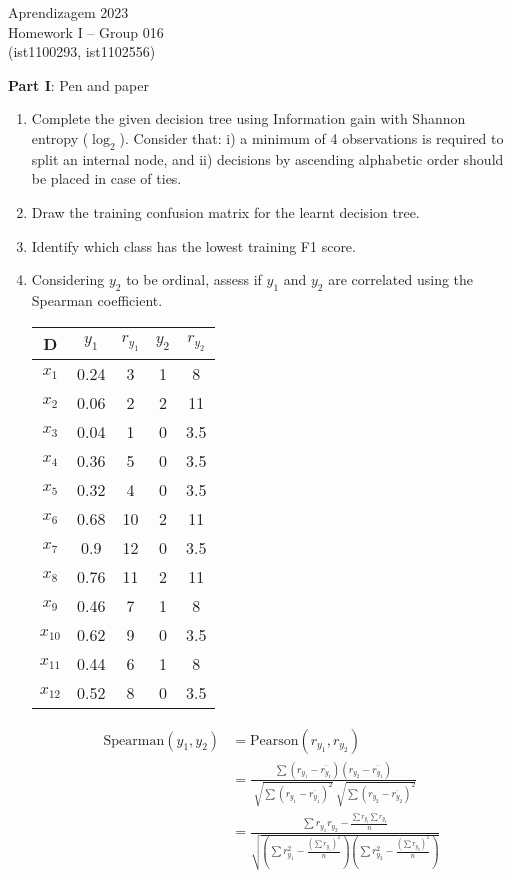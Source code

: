 \documentclass[12pt]{article}
\begin{document}
\center
Aprendizagem 2023\\
Homework I -- Group 016\\
(ist1100293, ist1102556)\vskip 1cm

\large{\textbf{Part I}: Pen and paper}\normalsize

\begin{enumerate}[leftmargin=\labelsep]
\item Complete the given decision tree using Information gain with Shannon entropy ($\log_2$).
Consider that: i) a minimum of 4 observations is required to split an internal node, and
ii) decisions by ascending alphabetic order should be placed in case of ties.
    

\item Draw the training confusion matrix for the learnt decision tree.

\item Identify which class has the lowest training F1 score.

\item Considering $y_2$ to be ordinal, assess if $y_1$ and $y_2$ are correlated using the Spearman coefficient.
\begin{center}
    
    \begin{tabular}{|c | c | c | c | c|}
        \hline
        D & $y_1$ & $r_{y_1}$ & $y_2$ & $r_{y_2}$\\
        \hline
        $x_1$    & 0.24 & 3  & 1 & 8 \\
        $x_2$    & 0.06 & 2  & 2 & 11 \\
        $x_3$    & 0.04 & 1  & 0 & 3.5 \\
        $x_4$    & 0.36 & 5  & 0 & 3.5 \\
        $x_5$    & 0.32 & 4  & 0 & 3.5 \\
        $x_6$    & 0.68 & 10 & 2 & 11 \\
        $x_7$    & 0.9  & 12 & 0 & 3.5 \\
        $x_8$    & 0.76 & 11 & 2 & 11 \\
        $x_9$    & 0.46 & 7  & 1 & 8 \\
        $x_{10}$ & 0.62 & 9  & 0 & 3.5 \\
        $x_{11}$ & 0.44 & 6  & 1 & 8 \\
        $x_{12}$ & 0.52 & 8  & 0 & 3.5 \\
        \hline
    \end{tabular}

    \begin{equation}
        \begin{split}
            \textrm{Spearman}(y_1, y_2) & = \textrm{Pearson}(r_{y_1}, r_{y_2}) \\
            & = \frac{\sum (r_{y_1}-\overline{r_{y_1}})(r_{y_2}-\overline{r_{y_1}})}{\sqrt[]{\sum (r_{y_1}-\overline{r_{y_1}})^2}\sqrt[]{\sum (r_{y_2}-\overline{r_{y_2}})^2}} \\
            & = \frac{\sum r_{y_1}r_{y_2} - \frac{\sum r_{y_1} \sum r_{y_2}}{n}}{\sqrt{(\sum r_{y_1}^2-\frac{(\sum r_{y_1})^2}{n})(\sum r_{y_2}^2-\frac{(\sum r_{y_2})^2}{n })}}
        \end{split}
    \end{equation}


\end{center}
\end{enumerate}
\end{document}

